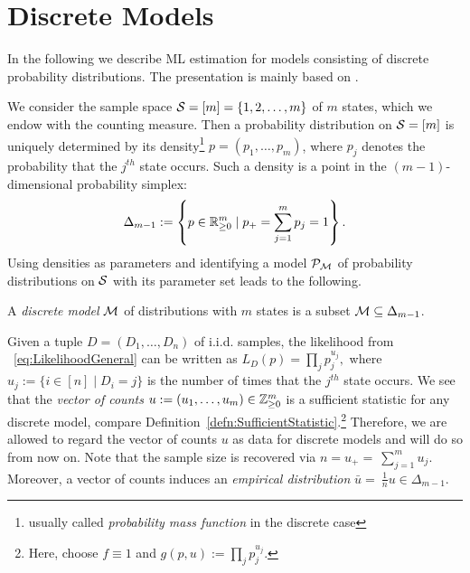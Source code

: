 \section{Discrete Models}\label{sec:DiscreteModels}

In the following we describe ML estimation for models consisting of discrete probability distributions. The presentation is mainly based on \cite[Section~2]{DiscretePaper}.

We consider the sample space $\mathcal{S} = [m] = \{1,2,\ldots,m\}$ of $m$ states, which we endow with the counting measure. Then a probability distribution on $\mathcal{S} = [m]$ is uniquely determined by its density\footnote{usually called \emph{probability mass function} in the discrete case} $p = (p_1,\ldots,p_m)$, where $p_j$ denotes the probability that the $j^{th}$ state occurs. 
Such a density is a point in the $(m-1)$-dimensional probability simplex:
	\[ \Delta_{m-1} := \left\{ p \in \mathbb R_{\geq 0}^m \mid p_+ = \sum_{j = 1}^m p_j =1 \right\} . \]
Using densities as parameters and identifying a model $\mathcal{P}_{\mathcal{M}}$ of probability distributions on $\mathcal{S}$ with its parameter set leads to the following.
	
\begin{defn}
	A \emph{discrete model} $\mathcal{M}$ of distributions with $m$ states is a subset $\mathcal{M} \subseteq \Delta_{m-1}$.
	\hfill{}
\end{defn}

Given a tuple $D = (D_1,\ldots,D_n)$ of i.i.d. samples, the likelihood from ~\eqref{eq:LikelihoodGeneral} can be written as
	$L_D(p) = \prod_j p_{j}^{u_j},$
where $u_j := \{ i \in [n] \mid D_i = j \}$ is the number of times that the $j^{th}$ state occurs. We see that the \emph{vector of counts} $u := (u_1,\ldots,u_m) \in \mathbb Z^{m}_{\geq 0}$ is a sufficient statistic for any discrete model, compare Definition~\ref{defn:SufficientStatistic}.\footnote{Here, choose $f \equiv 1$ and $g(p,u) := \prod_j p_{j}^{u_j}$.}
Therefore, we are allowed to regard the vector of counts $u$ as data for discrete models and will do so from now on.
Note that the sample size is recovered via $n = u_+ =~\sum_{j=1}^m u_j$. Moreover, a vector of counts induces an \emph{empirical distribution} $\bar{u}=~\frac{1}{n}u \in \Delta_{m-1}$.

